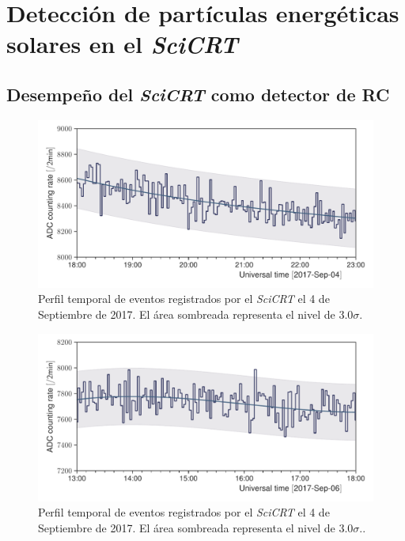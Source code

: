 
\chapter{Detección de partículas energéticas\\ solares en el \emph{SciCRT}}
\label{chap:cuatro}
\section{Desempeño del \emph{SciCRT} como detector de RC}



\begin{figure}
        \centering
        \includegraphics[width=\textwidth]{neutron-170904.pdf}
        \caption{Perfil temporal de eventos registrados por el \emph{SciCRT} el \num{4} de Septiembre de \num{2017}. El área sombreada representa el nivel de $3.0\sigma$.}
        \label{fig:september-04}
\end{figure}

\begin{figure}
        \centering
        \includegraphics[width=\textwidth]{neutron-170906.pdf}
        \caption{Perfil temporal de eventos registrados por el \emph{SciCRT} el \num{4} de Septiembre de \num{2017}. El área sombreada representa el nivel de $3.0\sigma$..}
        \label{fig:september-06}
\end{figure}
